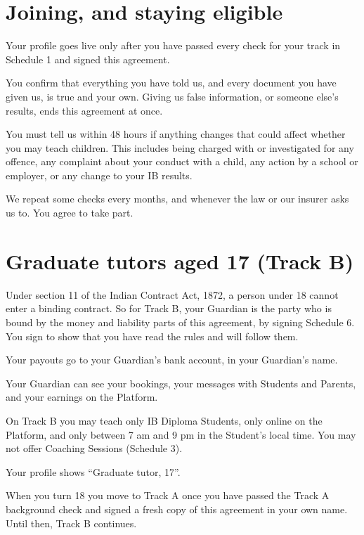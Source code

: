 \documentclass[11pt]{article}
\begin{document}
\section{Joining, and staying eligible}

\begin{clauses}
  \item Your profile goes live only after you have passed every check for your track in Schedule 1 and signed this agreement.
  \item You confirm that everything you have told us, and every document you have given us, is true and your own. Giving us false information, or someone else's results, ends this agreement at once.
  \item You must tell us within 48 hours if anything changes that could affect whether you may teach children. This includes being charged with or investigated for any offence, any complaint about your conduct with a child, any action by a school or employer, or any change to your IB results.
  \item We repeat some checks every  months, and whenever the law or our insurer asks us to. You agree to take part.
\end{clauses}

\section{Graduate tutors aged 17 (Track B)}

\begin{clauses}
  \item Under section 11 of the Indian Contract Act, 1872, a person under 18 cannot enter a binding contract. So for Track B, your Guardian is the party who is bound by the money and liability parts of this agreement, by signing Schedule 6. You sign to show that you have read the rules and will follow them.
  \item Your payouts go to your Guardian's bank account, in your Guardian's name.
  \item Your Guardian can see your bookings, your messages with Students and Parents, and your earnings on the Platform.
  \item On Track B you may teach only IB Diploma Students, only online on the Platform, and only between 7 am and 9 pm in the Student's local time. You may not offer Coaching Sessions (Schedule 3).
  \item Your profile shows ``Graduate tutor, 17''.
  \item When you turn 18 you move to Track A once you have passed the Track A background check and signed a fresh copy of this agreement in your own name. Until then, Track B continues.
\end{clauses}
\end{document}
